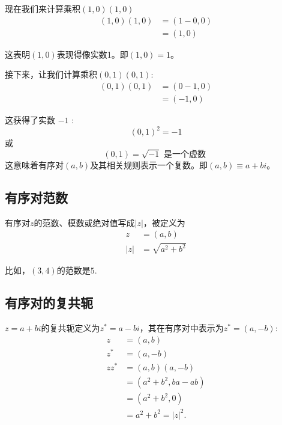 现在我们来计算乘积$(1,0)(1,0)$
$$
  \begin{aligned}
    (1,0)(1,0) & =(1-0,0) \\
               & =(1,0)
  \end{aligned}
$$

这表明$(1,0)$表现得像实数1。即$(1,0)=1$。

接下来，让我们计算乘积$(0,1)(0,1)$:
$$
  \begin{aligned}
    (0,1)(0,1) & =(0-1,0) \\
               & =(-1,0)
  \end{aligned}
$$

这获得了实数 $-1$ :
$$
  (0,1)^{2}=-1
$$
或
$$
  (0,1)=\sqrt{-1} \text { 是一个虚数 }
$$
这意味着有序对$(a, b)$及其相关规则表示一个复数。即$(a, b) \equiv a+b i$。

\subsection{有序对范数}
有序对$z$的范数、模数或绝对值写成$|z|$，被定义为
$$
  \begin{aligned}
    z   & =(a, b)             \\
    |z| & =\sqrt{a^{2}+b^{2}}
  \end{aligned}
$$

比如，$(3,4)$的范数是$5$.

\subsection{有序对的复共轭}
$z=a+b i$的复共轭定义为$z^{*}=a-b i$，其在有序对中表示为$z^{*}=(a,-b)$:
$$
  \begin{aligned}
    z       & =(a, b)                            \\
    z^{*}   & =(a,-b)                            \\
    z z^{*} & =(a, b)(a,-b)                      \\
            & =\left(a^{2}+b^{2}, b a-a b\right) \\
            & =\left(a^{2}+b^{2}, 0\right)       \\
            & =a^{2}+b^{2}=|z|^{2} .
  \end{aligned}
$$

